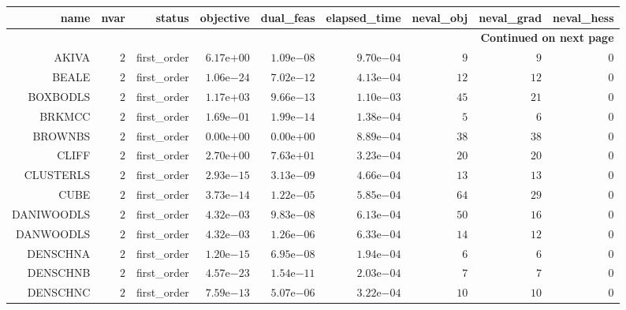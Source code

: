 \begin{longtable}{rrrrrrrrr}
\hline
name & nvar & status & objective & dual\_feas & elapsed\_time & neval\_obj & neval\_grad & neval\_hess \\\hline
\endhead
\hline
\multicolumn{9}{r}{{\bfseries Continued on next page}}\\
\hline
\endfoot
\endlastfoot
AKIVA & \(     2\) & first\_order & \( 6.17\)e\(+00\) & \( 1.09\)e\(-08\) & \( 9.70\)e\(-04\) & \(     9\) & \(     9\) & \(     0\) \\
BEALE & \(     2\) & first\_order & \( 1.06\)e\(-24\) & \( 7.02\)e\(-12\) & \( 4.13\)e\(-04\) & \(    12\) & \(    12\) & \(     0\) \\
BOXBODLS & \(     2\) & first\_order & \( 1.17\)e\(+03\) & \( 9.66\)e\(-13\) & \( 1.10\)e\(-03\) & \(    45\) & \(    21\) & \(     0\) \\
BRKMCC & \(     2\) & first\_order & \( 1.69\)e\(-01\) & \( 1.99\)e\(-14\) & \( 1.38\)e\(-04\) & \(     5\) & \(     6\) & \(     0\) \\
BROWNBS & \(     2\) & first\_order & \( 0.00\)e\(+00\) & \( 0.00\)e\(+00\) & \( 8.89\)e\(-04\) & \(    38\) & \(    38\) & \(     0\) \\
CLIFF & \(     2\) & first\_order & \( 2.70\)e\(+00\) & \( 7.63\)e\(+01\) & \( 3.23\)e\(-04\) & \(    20\) & \(    20\) & \(     0\) \\
CLUSTERLS & \(     2\) & first\_order & \( 2.93\)e\(-15\) & \( 3.13\)e\(-09\) & \( 4.66\)e\(-04\) & \(    13\) & \(    13\) & \(     0\) \\
CUBE & \(     2\) & first\_order & \( 3.73\)e\(-14\) & \( 1.22\)e\(-05\) & \( 5.85\)e\(-04\) & \(    64\) & \(    29\) & \(     0\) \\
DANIWOODLS & \(     2\) & first\_order & \( 4.32\)e\(-03\) & \( 9.83\)e\(-08\) & \( 6.13\)e\(-04\) & \(    50\) & \(    16\) & \(     0\) \\
DANWOODLS & \(     2\) & first\_order & \( 4.32\)e\(-03\) & \( 1.26\)e\(-06\) & \( 6.33\)e\(-04\) & \(    14\) & \(    12\) & \(     0\) \\
DENSCHNA & \(     2\) & first\_order & \( 1.20\)e\(-15\) & \( 6.95\)e\(-08\) & \( 1.94\)e\(-04\) & \(     6\) & \(     6\) & \(     0\) \\
DENSCHNB & \(     2\) & first\_order & \( 4.57\)e\(-23\) & \( 1.54\)e\(-11\) & \( 2.03\)e\(-04\) & \(     7\) & \(     7\) & \(     0\) \\
DENSCHNC & \(     2\) & first\_order & \( 7.59\)e\(-13\) & \( 5.07\)e\(-06\) & \( 3.22\)e\(-04\) & \(    10\) & \(    10\) & \(     0\) \\

\end{longtable}
